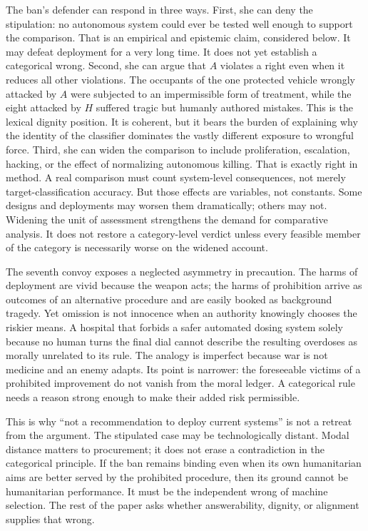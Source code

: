 \documentclass[11pt]{article}
\begin{document}
The ban's defender can respond in three ways. First, she can deny the stipulation: no autonomous system could ever be tested well enough to support the comparison. That is an empirical and epistemic claim, considered below. It may defeat deployment for a very long time. It does not yet establish a categorical wrong. Second, she can argue that $A$ violates a right even when it reduces all other violations. The occupants of the one protected vehicle wrongly attacked by $A$ were subjected to an impermissible form of treatment, while the eight attacked by $H$ suffered tragic but humanly authored mistakes. This is the lexical dignity position. It is coherent, but it bears the burden of explaining why the identity of the classifier dominates the vastly different exposure to wrongful force. Third, she can widen the comparison to include proliferation, escalation, hacking, or the effect of normalizing autonomous killing. That is exactly right in method. A real comparison must count system-level consequences, not merely target-classification accuracy. But those effects are variables, not constants. Some designs and deployments may worsen them dramatically; others may not. Widening the unit of assessment strengthens the demand for comparative analysis. It does not restore a category-level verdict unless every feasible member of the category is necessarily worse on the widened account.

The seventh convoy exposes a neglected asymmetry in precaution. The harms of deployment are vivid because the weapon acts; the harms of prohibition arrive as outcomes of an alternative procedure and are easily booked as background tragedy. Yet omission is not innocence when an authority knowingly chooses the riskier means. A hospital that forbids a safer automated dosing system solely because no human turns the final dial cannot describe the resulting overdoses as morally unrelated to its rule. The analogy is imperfect because war is not medicine and an enemy adapts. Its point is narrower: the foreseeable victims of a prohibited improvement do not vanish from the moral ledger. A categorical rule needs a reason strong enough to make their added risk permissible.

This is why ``not a recommendation to deploy current systems'' is not a retreat from the argument. The stipulated case may be technologically distant. Modal distance matters to procurement; it does not erase a contradiction in the categorical principle. If the ban remains binding even when its own humanitarian aims are better served by the prohibited procedure, then its ground cannot be humanitarian performance. It must be the independent wrong of machine selection. The rest of the paper asks whether answerability, dignity, or alignment supplies that wrong.
\end{document}
